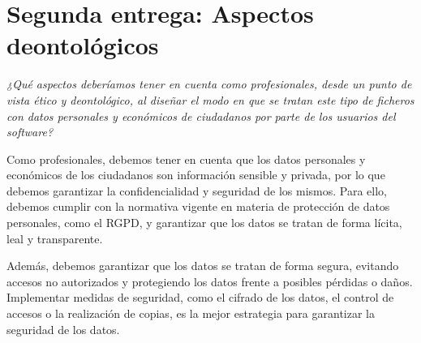 \newpage{}
\section{Segunda entrega: Aspectos deontológicos}
\textit{¿Qué aspectos deberíamos tener en cuenta como profesionales, desde un punto de vista ético
y deontológico, al diseñar el modo en que se tratan este tipo de ficheros con datos personales y
económicos de ciudadanos por parte de los usuarios del software?}

Como profesionales, debemos tener en cuenta que los datos personales y económicos de los ciudadanos
son información sensible y privada, por lo que debemos garantizar la confidencialidad y seguridad
de los mismos. Para ello, debemos cumplir con la normativa vigente en materia de protección de datos
personales, como el RGPD, y garantizar que los datos se tratan de forma lícita, leal y transparente.

Además, debemos garantizar que los datos se tratan de forma segura, evitando accesos no autorizados
y protegiendo los datos frente a posibles pérdidas o daños. Implementar medidas de seguridad, como
el cifrado de los datos, el control de accesos o la realización de copias, es la mejor estrategia
para garantizar la seguridad de los datos.
